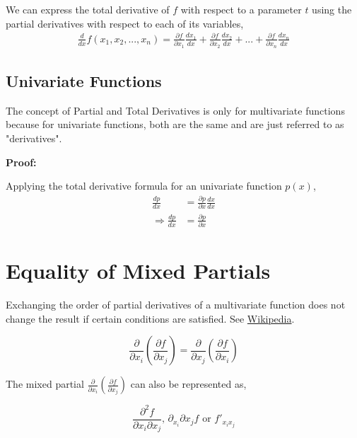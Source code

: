 \documentclass[12pt]{article}
\begin{document}
We can express the total derivative of $f$ with respect to a parameter $t$ using the partial derivatives with respect to each of its variables,
\begin{align}
    \frac{d}{dx}f(x_1, x_2, ..., x_n) = \frac{\partial f}{\partial x_1} \frac{dx_1}{dx} + \frac{\partial f}{\partial x_2} \frac{dx_2}{dx} + ... + \frac{\partial f}{\partial x_n} \frac{dx_n}{dx}
\end{align}

\subsection{Univariate Functions}

The concept of Partial and Total Derivatives is only for multivariate functions because for univariate functions, both are the same and are just referred to as "derivatives". \vspace{.2cm}

\begin{note}
    \textbf{Proof:} \vspace{.2cm}

    Applying the total derivative formula for an univariate function $p(x)$,
    \begin{align*}
        \frac{dp}{dx} & = \frac{\partial p}{\partial x} \frac{dx}{dx} \\
        \Rightarrow \frac{dp}{dx} & = \frac{\partial p}{\partial x}
    \end{align*}
\end{note}

\section{Equality of Mixed Partials}

Exchanging the order of partial derivatives of a multivariate function does not change the result if certain conditions are satisfied. See \href{https://en.wikipedia.org/wiki/Symmetry_of_second_derivatives}{Wikipedia}.

\begin{equation}
    \frac{\partial}{\partial x_i} (\frac{\partial f}{\partial x_j}) = \frac{\partial}{\partial x_j} (\frac{\partial f}{\partial x_i})
\end{equation} \vspace{.2cm}

The mixed partial $\frac{\partial}{\partial x_i} (\frac{\partial f}{\partial x_j})$ can also be represented as,

\begin{equation*}
    \frac{\partial^2 f}{\partial x_i \partial x_j} \text{, } \partial_{x_i}\partial{x_j} f \text{ or } f'_{x_{i}x_{j}}
\end{equation*}
\end{document}
